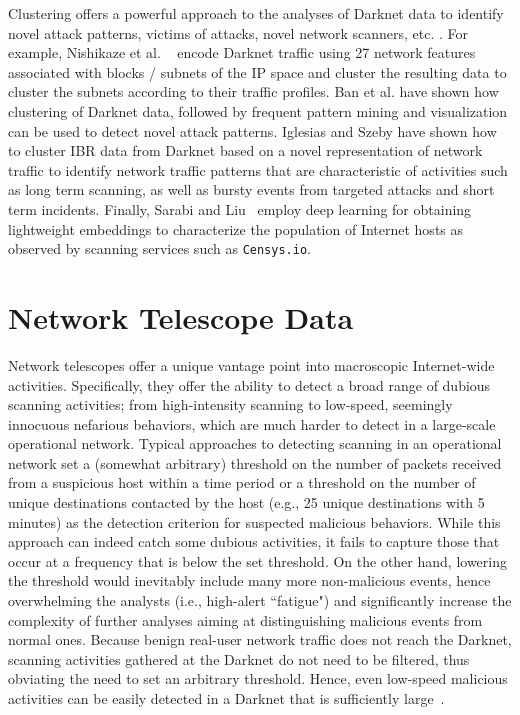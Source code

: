 \documentclass[manuscript, nonacm]{acmart}
\begin{document}
Clustering offers a powerful approach to the analyses of Darknet data to identify novel attack patterns, victims of attacks, novel network scanners, etc. \cite{Nishikaze2015TAP,Ban2016MiningClustering,Iglesias2017IBRpatterns}.
For example, Nishikaze et al. ~\cite{Nishikaze2015TAP} encode Darknet traffic using 
27 network features
associated with blocks / subnets
of the IP space and cluster the resulting data to cluster the subnets according to their traffic profiles. Ban et al. \cite{Ban2016MiningClustering} have shown how clustering of Darknet data, followed by frequent pattern mining and visualization can be used to detect novel attack patterns. Iglesias and Szeby \cite{Iglesias2017IBRpatterns} have shown how to cluster IBR data from Darknet based on a novel representation of network traffic to identify network traffic patterns that are characteristic of activities such as long term scanning, as well as bursty events from targeted attacks and short term incidents.
Finally, Sarabi and Liu~\cite{10.1145/3278532.3278545} employ
deep learning for obtaining lightweight embeddings to characterize the population of Internet hosts
as observed by scanning services such as \texttt{Censys.io}.  
 

\section{Network Telescope Data}
\label{sec:DarknetObservabilities}

Network telescopes offer a unique vantage point into macroscopic Internet-wide activities.
Specifically, they offer the ability 
to detect a broad range of dubious scanning activities;
from high-intensity scanning to 
low-speed, seemingly innocuous nefarious behaviors, which are much harder to detect in a large-scale operational network.  
Typical approaches to detecting scanning 
in an operational network set a (somewhat arbitrary) threshold on the number of packets received from a suspicious host within a time period
or a threshold on the number of unique destinations contacted by the host 
(e.g., 25 unique destinations with 5 minutes) 
as the detection criterion for suspected malicious behaviors.  While this
approach can indeed catch some dubious activities, it fails to capture those that occur at a frequency that is below the set threshold.  On the other hand, lowering the threshold would inevitably include many more non-malicious events, hence overwhelming the analysts (i.e., high-alert ``fatigue")
and significantly increase the complexity of
further analyses aiming at distinguishing malicious 
events from normal ones.  
Because benign real-user
network traffic does not reach the Darknet, scanning activities gathered at
the Darknet do not need to be filtered, thus obviating the need to set an arbitrary threshold.  Hence, even low-speed malicious activities can be easily detected in a Darknet that is sufficiently large~\cite{caida_telescope_report}.
\end{document}
